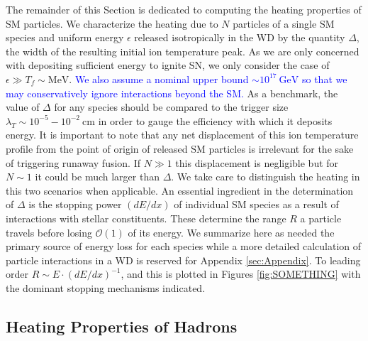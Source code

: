 \documentclass[twocolumn,showpacs,preprintnumbers,amsmath,amssymb,prd]{revtex4}
\newcommand{\OO}{\mathcal{O}}
\newcommand{\GeV}{\text{GeV}}
\def\r{\right)}
\def\l{\left(}
\begin{document}
The remainder of this Section is dedicated to computing the heating properties of SM particles.
We characterize the heating due to $N$ particles of a single SM species and uniform energy $\epsilon$ released isotropically in the WD by the quantity $\Delta$, the width of the resulting initial ion temperature peak. 
As we are only concerned with depositing sufficient energy to ignite SN, we only consider the case of $\epsilon \gg T_f \sim \text{MeV}$. 
\textcolor{blue}{We also assume a nominal upper bound $\sim 10^{17} ~\GeV$ so that we may conservatively ignore interactions beyond the SM.} 
As a benchmark, the value of $\Delta$ for any species should be compared to the trigger size $\lambda_T \sim 10^{-5} - 10^{-2} ~\text{cm}$ in order to gauge the efficiency with which it deposits energy. 
It is important to note that any net displacement of this ion temperature profile from the point of origin of released SM particles is irrelevant for the sake of triggering runaway fusion. 
If $N \gg 1$ this displacement is negligible but for $N \sim 1$ it could be much larger than $\Delta$. 
We take care to distinguish the heating in this two scenarios when applicable.
An essential ingredient in the determination of $\Delta$ is the stopping power $(dE/dx)$ of individual SM species as a result of interactions with stellar constituents.  
These determine the range $R$ a particle travels before losing $\OO(1)$ of its energy.
We summarize here as needed the primary source of energy loss for each species while a more detailed calculation of particle interactions in a WD is reserved for Appendix \ref{sec:Appendix}. 
To leading order $R \sim E \cdot \l dE/dx \r^{-1}$, and this is plotted in Figures \ref{fig:SOMETHING} with the dominant stopping mechanisms indicated. 


\subsection{Heating Properties of Hadrons}
\end{document}

